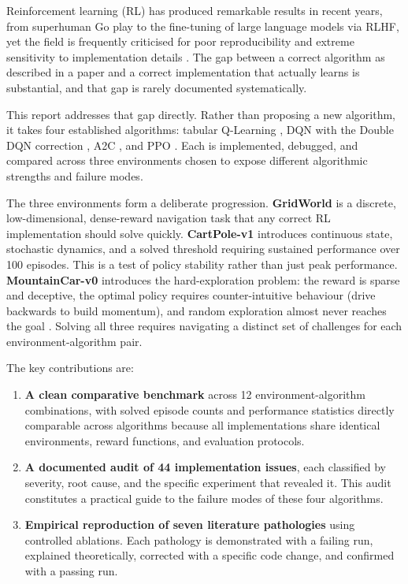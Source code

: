 \documentclass[a4paper,12pt]{article}
\begin{document}
Reinforcement learning (RL) has produced remarkable results in recent years, from superhuman Go play \cite{silver2021reward} to the fine-tuning of large language models via RLHF, yet the field is frequently criticised for poor reproducibility and extreme sensitivity to implementation details \cite{henderson2018deep,engstrom2020implementation}. The gap between a correct algorithm as described in a paper and a correct implementation that actually learns is substantial, and that gap is rarely documented systematically.

This report addresses that gap directly. Rather than proposing a new algorithm, it takes four established algorithms: tabular Q-Learning \cite{watkins1992q}, DQN \cite{mnih2015human} with the Double DQN correction \cite{van2016deep}, A2C \cite{mnih2016asynchronous}, and PPO \cite{schulman2017proximal}. Each is implemented, debugged, and compared across three environments chosen to expose different algorithmic strengths and failure modes.

The three environments form a deliberate progression. \textbf{GridWorld} is a discrete, low-dimensional, dense-reward navigation task that any correct RL implementation should solve quickly. \textbf{CartPole-v1} introduces continuous state, stochastic dynamics, and a solved threshold requiring sustained performance over 100 episodes. This is a test of policy stability rather than just peak performance. \textbf{MountainCar-v0} introduces the hard-exploration problem: the reward is sparse and deceptive, the optimal policy requires counter-intuitive behaviour (drive backwards to build momentum), and random exploration almost never reaches the goal \cite{dann2022exploration}. Solving all three requires navigating a distinct set of challenges for each environment-algorithm pair.

The key contributions are:

\begin{enumerate}
  \item \textbf{A clean comparative benchmark} across 12 environment-algorithm combinations, with solved episode counts and performance statistics directly comparable across algorithms because all implementations share identical environments, reward functions, and evaluation protocols.

  \item \textbf{A documented audit of 44 implementation issues}, each classified by severity, root cause, and the specific experiment that revealed it. This audit constitutes a practical guide to the failure modes of these four algorithms.

  \item \textbf{Empirical reproduction of seven literature pathologies} using controlled ablations. Each pathology is demonstrated with a failing run, explained theoretically, corrected with a specific code change, and confirmed with a passing run.
\end{enumerate}
\end{document}
